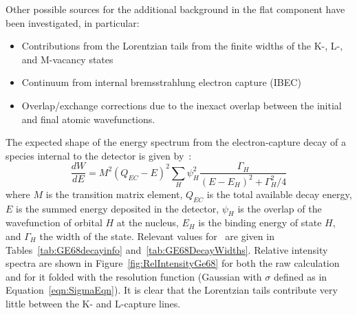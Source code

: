 Other possible sources for the additional background in the flat component have been investigated, in particular:
						\begin{itemize} 
							\item Contributions from the Lorentzian tails from the finite widths of the K-, L-, 
									and M-vacancy states
							\item Continuum from internal bremsstrahlung electron capture (IBEC)
							\item Overlap/exchange corrections due to the inexact overlap between the initial and final atomic									wavefunctions.
						\end{itemize} 
The expected shape of the energy spectrum from the electron-capture decay of a species internal to the detector is given by~\cite{Gatti08}:
						\begin{equation}
							\frac{dW}{dE} = M^2(Q_{EC}-E)^2 \sum_H{\psi_H^2 \frac{\Gamma_H}{(E-E_H)^2 + \Gamma_H^2/4}}
						\end{equation}
where $M$ is the transition matrix element, $Q_{EC}$ is the total available decay
energy, $E$ is the summed energy deposited in the detector, $\psi_H$ is the
overlap of the wavefunction of orbital $H$ at the nucleus, $E_H$ is the binding
energy of state $H$, and $\Gamma_H$ the width of the state.  Relevant values for \gersixeight~are given
in Tables~\ref{tab:GE68decayinfo} and~\ref{tab:GE68DecayWidths}.  Relative intensity spectra are shown
in Figure~\ref{fig:RelIntensityGe68} for both the raw calculation and for it folded with the resolution function (Gaussian
with $\sigma$ defined as in Equation~\ref{eqn:SigmaEqn}).  It is clear that the Lorentzian tails contribute very little
between the K- and L-capture lines. 

